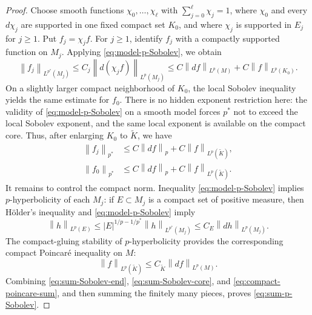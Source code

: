 \documentclass[12pt]{amsart}
\newcommand{\norm}[2]{\left\lVert #1\right\rVert_{#2}}
\theoremstyle{remark}
\begin{document}
\begin{proof}
Choose smooth functions $\chi_0,\ldots,\chi_\ell$ with
$\sum_{j=0}^\ell\chi_j=1$, where $\chi_0$ and every $d\chi_j$ are supported
in one fixed compact set $K_0$, and where $\chi_j$ is supported in $E_j$ for
$j\geq1$.  Put $f_j=\chi_jf$.  For $j\geq1$, identify $f_j$ with a compactly
supported function on $M_j$.  Applying \eqref{eq:model-p-Sobolev}, we obtain
\[
 \norm{f_j}{L^{p^*}(M_j)}
 \leq C_j\norm{d(\chi_jf)}{L^p(M_j)}
 \leq C\norm{df}{L^p(M)}+C\norm f{L^p(K_0)}.
\]
On a slightly larger compact neighborhood of $K_0$, the local Sobolev
inequality yields the same estimate for $f_0$.  There is no hidden exponent
restriction here: the validity of \eqref{eq:model-p-Sobolev} on a smooth
model forces $p^*$ not to exceed the local Sobolev exponent, and the same
local exponent is available on the compact core.  Thus, after enlarging
$K_0$ to $\widetilde K$, we have
\begin{align}
 \norm{f_j}{p^*}&\leq C\norm{df}{p}+C\norm f{L^p(\widetilde K)},
 \label{eq:sum-Sobolev-end}\\
 \norm{f_0}{p^*}&\leq C\norm{df}{p}+C\norm f{L^p(\widetilde K)}.
 \label{eq:sum-Sobolev-core}
\end{align}
It remains to control the compact norm.  Inequality
\eqref{eq:model-p-Sobolev} implies $p$-hyperbolicity of each $M_j$: if
$E\subset M_j$ is a compact set of positive measure, then H\"older's
inequality and \eqref{eq:model-p-Sobolev} imply
\[
 \norm h{L^p(E)}
 \leq |E|^{1/p-1/p^*}\norm h{L^{p^*}(M_j)}
 \leq C_E\norm{dh}{L^p(M_j)}.
\]
The compact-gluing stability of $p$-hyperbolicity
\cite[Corollary~2.1]{Devyver15} provides the corresponding compact Poincar\'e
inequality on $M$:
\begin{equation}\label{eq:compact-poincare-sum}
 \norm f{L^p(\widetilde K)}\leq C_{\widetilde K}\norm{df}{L^p(M)}.
\end{equation}
Combining \eqref{eq:sum-Sobolev-end}, \eqref{eq:sum-Sobolev-core}, and
\eqref{eq:compact-poincare-sum}, and then summing the finitely many pieces,
proves \eqref{eq:sum-p-Sobolev}.





\end{proof}
\end{document}

